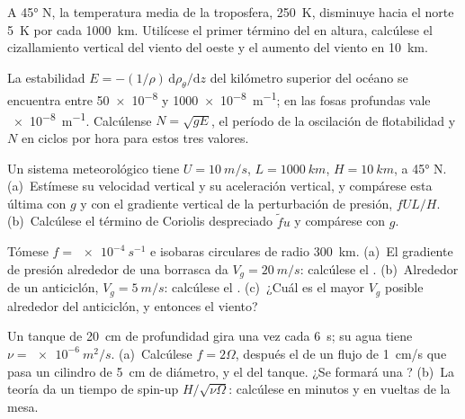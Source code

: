 \begin{exercise}[$\star$]\label{exo:b3:gfd-foundations:3}
A \ang{45} N, la temperatura media de la troposfera, \qty{250}{K}, disminuye
hacia el norte \qty{5}{K} por cada \qty{1000}{km}. Utilícese el primer término del
 en altura, calcúlese el cizallamiento vertical del viento del oeste y el
aumento del viento en \qty{10}{km}.
\end{exercise}

\begin{exercise}[$\star$]\label{exo:b3:gfd-foundations:4}
La estabilidad $E = -(1/\rho)\,\mathrm d\rho_\theta/\mathrm dz$ del kilómetro superior
del océano se encuentra entre \num{50e-8} y \qty{1000e-8}{m^{-1}};
en las fosas profundas vale \qty{e-8}{m^{-1}}. Calcúlense $N = \sqrt{gE}$, el período
de la oscilación de flotabilidad y $N$ en ciclos por hora para estos
tres valores.
\end{exercise}

\begin{exercise}[$\star\star$]\label{exo:b3:gfd-foundations:5}
Un sistema meteorológico tiene $U = \qty{10}{m/s}$, $L = \qty{1000}{km}$, $H =
\qty{10}{km}$, a \ang{45} N. (a)~Estímese su velocidad vertical y su aceleración
vertical, y compárese esta última con $g$ y con el gradiente vertical de la
perturbación de presión, $fUL/H$. (b)~Calcúlese el término de Coriolis despreciado
$\tilde fu$ y compárese con $g$.
\end{exercise}

\begin{exercise}[$\star\star$]\label{exo:b3:gfd-foundations:6}
Tómese $f = \qty{e-4}{s^{-1}}$ e isobaras circulares de radio
\qty{300}{km}. (a)~El gradiente de presión alrededor de una borrasca da $V_g =
\qty{20}{m/s}$: calcúlese el . (b)~Alrededor de un anticiclón,
$V_g = \qty{5}{m/s}$: calcúlese el . (c)~¿Cuál es el mayor
$V_g$ posible alrededor del anticiclón, y entonces el viento?
\end{exercise}

\begin{exercise}[$\star\star$]\label{exo:b3:gfd-foundations:7}
Un tanque de \qty{20}{cm} de profundidad gira una vez cada \qty{6}{s}; su agua tiene $\nu =
\qty{e-6}{m^2/s}$. (a)~Calcúlese $f = 2\Omega$, después el  de un
flujo de \qty{1}{cm/s} que pasa un cilindro de \qty{5}{cm} de diámetro, y el  del tanque. ¿Se formará una ? (b)~La teoría da un tiempo de spin-up
$H/\sqrt{\nu\Omega}$: calcúlese en minutos y en vueltas de la mesa.
\end{exercise}

